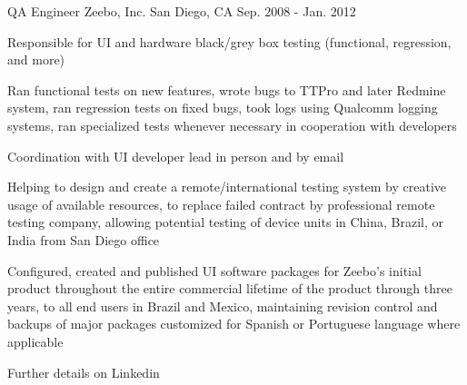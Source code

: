\begin{cventries}
\cventry
  {QA Engineer} %
  {Zeebo, Inc.} %
  {San Diego, CA} %
  {Sep. 2008 - Jan. 2012} %
  {
    \begin{cvitems} %
      \item[] {Responsible for UI and hardware black/grey box testing (functional, regression, and more)}
      \item[]
      \item {Ran functional tests on new features, wrote bugs to TTPro and later Redmine system, ran regression tests on fixed bugs, took logs using Qualcomm logging systems, ran specialized tests whenever necessary in cooperation with developers}
      \item {Coordination with UI developer lead in person and by email}
      \item {Helping to design and create a remote/international testing system by creative usage of available resources, to replace failed contract by professional remote testing company, allowing potential testing of device units in China, Brazil, or India from San Diego office}
      \item {Configured, created and published UI software packages for Zeebo's initial product throughout the entire commercial lifetime of the product through three years, to all end users in Brazil and Mexico, maintaining revision control and backups of major packages customized for Spanish or Portuguese language where applicable}
    \end{cvitems}
  }

\cventry
  {Further details on Linkedin}
  {}
  {}
  {}
  {}

\end{cventries}
